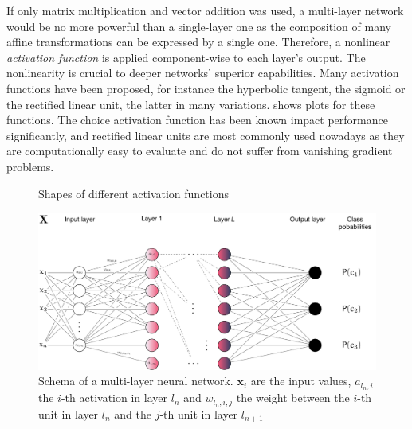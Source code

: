 If only matrix multiplication and vector addition was used, a multi-layer network would be no more
powerful than a single-layer one as the composition of many affine
transformations can be expressed by a single one. Therefore, a nonlinear
\emph{activation function} is applied component-wise to each layer's output. The
nonlinearity is crucial to deeper networks' superior capabilities. Many
activation functions have been proposed, for instance the hyperbolic tangent,
the sigmoid or the rectified linear unit, the latter in many variations.
 shows plots for these functions. The
choice activation function has been known impact performance significantly, and
rectified linear units are most commonly used nowadays as they are
computationally easy to evaluate and do not suffer from vanishing gradient
problems.

\begin{figure}
    \centering
    \caption{Shapes of different activation functions}
    \label{fig:activation_functions}
\end{figure}

\begin{figure}
    \centering
    \includegraphics[max width=\textwidth]{gfx/diagrams/neural_network/neural_net.pdf}
    \caption[Schema of a multi-layer neural network]{Schema of a multi-layer neural network. \(\mathbf{x}_i\) are
        the input values, \(a_{l_n,i}\) the \(i\)-th activation in layer \(l_n\)
        and \(w_{l_n,i,j}\) the weight between the \(i\)-th unit in layer
    \(l_n\) and the \(j\)-th unit in layer \(l_{n+1}\)}
    \label{fig:neuralnet}
\end{figure}

